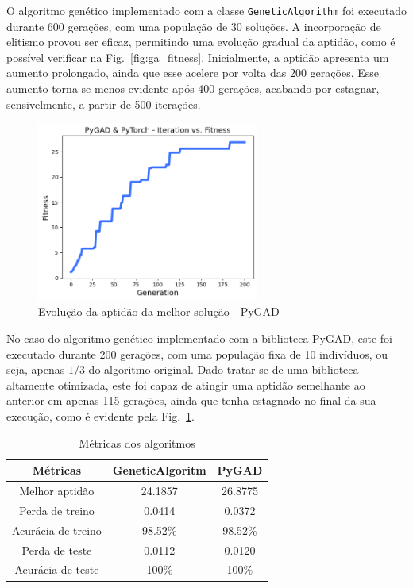O algoritmo genético implementado com a classe \texttt{GeneticAlgorithm} foi executado durante 600 gerações, com uma população de 30 soluções.
A incorporação de elitismo provou ser eficaz, permitindo uma evolução gradual da aptidão, como é possível verificar na Fig.~\ref{fig:ga_fitness}.
Inicialmente, a aptidão apresenta um aumento prolongado, ainda que esse acelere por volta das 200 gerações.
Esse aumento torna-se menos evidente após 400 gerações, acabando por estagnar, sensivelmente, a partir de 500 iterações.

\begin{figure}[htbp]
    \centering
    \includegraphics[width=0.65\textwidth]{images/pygad_fitness}
    \caption{Evolução da aptidão da melhor solução - PyGAD}
    \label{fig:pygad_fitness}
\end{figure}

No caso do algoritmo genético implementado com a biblioteca PyGAD, este foi executado durante 200 gerações, com uma população fixa de 10 indivíduos, ou seja, apenas $1/3$ do algoritmo original.
Dado tratar-se de uma biblioteca altamente otimizada, este foi capaz de atingir uma aptidão semelhante ao anterior em apenas 115 gerações, ainda que tenha estagnado no final da sua execução, como é evidente pela Fig.~\ref{fig:pygad_fitness}.

\begin{table}[htbp]
    \centering
    \begin{tabular}{ccc}
        \hline
        \textbf{Métricas}  & \textbf{GeneticAlgoritm} & \textbf{PyGAD} \\ \hline
        Melhor aptidão     & 24.1857                  & 26.8775        \\
        Perda de treino    & 0.0414                   & 0.0372         \\
        Acurácia de treino & 98.52\%                  & 98.52\%        \\
        Perda de teste     & 0.0112                   & 0.0120         \\
        Acurácia de teste  & 100\%                    & 100\%          \\ \hline
    \end{tabular}
    \caption{Métricas dos algoritmos}
    \label{tab:metrics}
\end{table}


